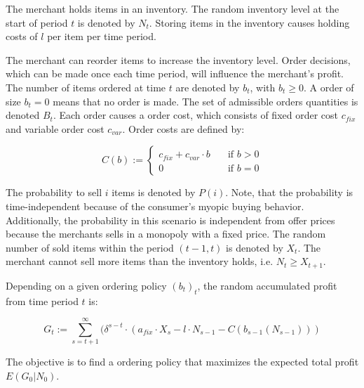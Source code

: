 The merchant holds items in an inventory.
The random inventory level at the start of period $t$ is denoted by $N_t$.
Storing items in the inventory causes holding costs of $l$ per item per time period. %

The merchant can reorder items to increase the inventory level.
Order decisions, which can be made once each time period, will influence the merchant's profit.
The number of items ordered at time $t$ are denoted by $b_t$, with $b_t \geq 0$.
A order of size $b_t = 0$ means that no order is made.
The set of admissible orders quantities is denoted $B_t$.
Each order causes a order cost, which consists of fixed order cost $c_{fix}$ and variable order cost $c_{var}$.
Order costs are defined by:

$$
C(b) := \begin{cases}
c_{fix} + c_{var} \cdot b  & \quad \text{if } b > 0 \\
0  & \quad \text{if } b = 0
\end{cases}
$$

The probability to sell $i$ items is denoted by $P(i)$.
Note, that the probability is time-independent because of the consumer's myopic buying behavior.
Additionally, the probability in this scenario is independent from offer prices because the merchants sells in a monopoly with a fixed price.
The random number of sold items within the period $(t-1, t)$ is denoted by $X_t$.
The merchant cannot sell more items than the inventory holds, i.e. $N_t \geq X_{t+1}$. %

Depending on a given ordering policy $(b_t)_t$, the random accumulated profit from time period $t$ is:

$$
G_t := \sum_{s=t+1}^{\infty} (\delta^{s-t} \cdot (a_{fix} \cdot X_s - l \cdot N_{s-1} - C(b_{s-1}(N_{s-1})))
$$

The objective is to find a ordering policy that maximizes the expected total profit $E(G_0 | N_0)$.


